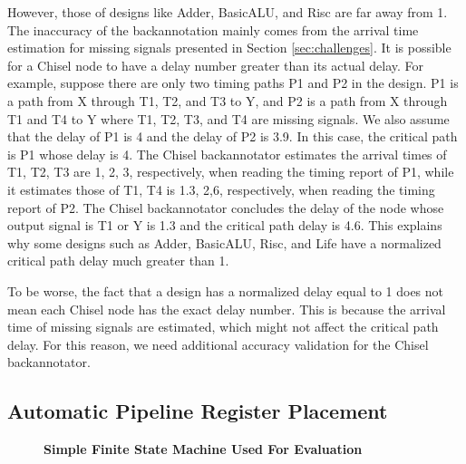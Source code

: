 However, those of designs like Adder, BasicALU, and Risc are far away from 1. The inaccuracy of the backannotation mainly comes from the arrival time estimation for missing signals presented in Section \ref{sec:challenges}. It is possible for a Chisel node to have a delay number greater than its actual delay. For example, suppose there are only two timing paths P1 and P2 in the design. P1 is a path from X through T1, T2, and T3 to Y, and P2 is a path from X through T1 and T4 to Y where T1, T2, T3, and T4 are missing signals. We also assume that the delay of P1 is 4 and the delay of P2 is 3.9. In this case, the critical path is P1 whose delay is 4. The Chisel backannotator estimates the arrival times of T1, T2, T3 are 1, 2, 3, respectively, when reading the timing report of P1, while it estimates those of T1, T4 is 1.3, 2,6, respectively, when reading the timing report of P2. The Chisel backannotator concludes the delay of the node whose output signal is T1 or Y is 1.3 and the critical path delay is 4.6. This explains why some designs such as Adder, BasicALU, Risc, and Life have a normalized critical path delay much greater than 1.

To be worse, the fact that a design has a normalized delay equal to 1 does not mean each Chisel node has the exact delay number. This is because the arrival time of missing signals are estimated, which might not affect the critical path delay. For this reason, we need additional accuracy validation for the Chisel backannotator. 

\subsection{Automatic Pipeline Register Placement}
\label{auto_result}

\begin{figure}[htb]
\centering
{}
\caption{{\bf Simple Finite State Machine Used For Evaluation}}
\label{fig:simpleFSM}
\end{figure}

